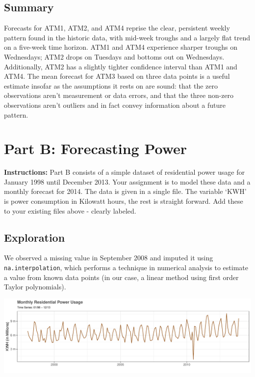 \documentclass[openany]{book}
\renewenvironment{quote}{\begin{myquote}}{\end{myquote}}
\begin{document}
\hypertarget{summary}{%
\section{Summary}\label{summary}}

Forecasts for ATM1, ATM2, and ATM4 reprise the clear, persistent weekly
pattern found in the historic data, with mid-week troughs and a largely
flat trend on a five-week time horizon. ATM1 and ATM4 experience sharper
troughs on Wednesdays; ATM2 drops on Tuesdays and bottoms out on
Wednesdays. Additionally, ATM2 has a slightly tighter confidence
interval than ATM1 and ATM4. The mean forecast for ATM3 based on three
data points is a useful estimate insofar as the assumptions it rests on
are sound: that the zero observations aren't measurement or data errors,
and that the three non-zero observations aren't outliers and in fact
convey information about a future pattern.

\hypertarget{part-b-forecasting-power}{%
\chapter{Part B: Forecasting Power}\label{part-b-forecasting-power}}

\begin{quote}
\textbf{Instructions:} Part B consists of a simple dataset of
residential power usage for January 1998 until December 2013. Your
assignment is to model these data and a monthly forecast for 2014. The
data is given in a single file. The variable `KWH' is power consumption
in Kilowatt hours, the rest is straight forward. Add these to your
existing files above - clearly labeled.
\end{quote}

\hypertarget{exploration-1}{%
\section{Exploration}\label{exploration-1}}

We observed a missing value in September 2008 and imputed it using
\texttt{na.interpolation}, which performs a technique in numerical
analysis to estimate a value from known data points (in our case, a
linear method using first order Taylor polynomials).

\includegraphics{Group2_Project1_Fall2019_files/figure-latex/unnamed-chunk-8-1.pdf}
\end{document}
